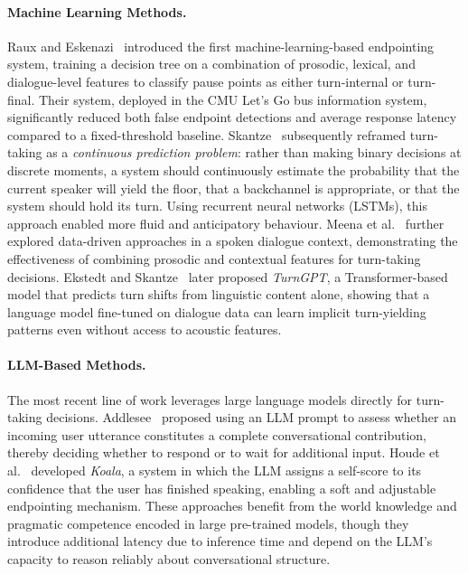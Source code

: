 \paragraph{Machine Learning Methods.}
Raux and Eskenazi~\cite{raux2009endpointing} introduced the first machine-learning-based endpointing system, training a decision tree on a combination of prosodic, lexical, and dialogue-level features to classify pause points as either turn-internal or turn-final. Their system, deployed in the CMU Let's Go bus information system, significantly reduced both false endpoint detections and average response latency compared to a fixed-threshold baseline. Skantze~\cite{skantze2017turntaking} subsequently reframed turn-taking as a \emph{continuous prediction problem}: rather than making binary decisions at discrete moments, a system should continuously estimate the probability that the current speaker will yield the floor, that a backchannel is appropriate, or that the system should hold its turn. Using recurrent neural networks (LSTMs), this approach enabled more fluid and anticipatory behaviour. Meena et al.~\cite{meena2014turntaking} further explored data-driven approaches in a spoken dialogue context, demonstrating the effectiveness of combining prosodic and contextual features for turn-taking decisions. Ekstedt and Skantze~\cite{ekstedt2020turngpt} later proposed \emph{TurnGPT}, a Transformer-based model that predicts turn shifts from linguistic content alone, showing that a language model fine-tuned on dialogue data can learn implicit turn-yielding patterns even without access to acoustic features.

\paragraph{LLM-Based Methods.}
The most recent line of work leverages large language models directly for turn-taking decisions. Addlesee~\cite{addlesee2024ari} proposed using an LLM prompt to assess whether an incoming user utterance constitutes a complete conversational contribution, thereby deciding whether to respond or to wait for additional input. Houde et al.~\cite{houde2025koala} developed \emph{Koala}, a system in which the LLM assigns a self-score to its confidence that the user has finished speaking, enabling a soft and adjustable endpointing mechanism. These approaches benefit from the world knowledge and pragmatic competence encoded in large pre-trained models, though they introduce additional latency due to inference time and depend on the LLM's capacity to reason reliably about conversational structure.

